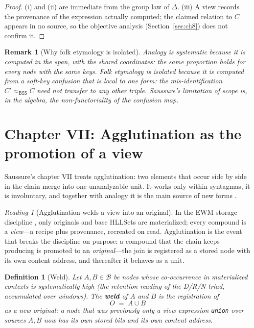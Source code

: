 \documentclass[11pt,a4paper]{article}
\newtheorem{definition}[principle]{Definition}
\newtheorem{remark}[principle]{Remark}
\theoremstyle{remark}
\newtheorem{reading}[principle]{Reading}
\newcommand{\Lat}{\ensuremath{\mathcal{B}}}              %
\newcommand{\xor}{\ensuremath{\Delta}}                   %
\newcommand{\BSS}{\ensuremath{\mathsf{BSS}}}             %
\begin{document}
\begin{proof}
(i) and (ii) are immediate from the group law of $\xor$. (iii) A view records
the provenance of the expression actually computed; the claimed relation to
$C$ appears in no source, so the objective analysis (Section~\ref{sec:ch8})
does not confirm it.
\end{proof}

\begin{remark}[Why folk etymology is isolated]
Analogy is systematic because it is computed in the span, with the shared
coordinates: the same proportion holds for every node with the same keys.
Folk etymology is isolated because it is computed from a soft-key confusion
that is local to one form: the mis-identification $C' \approx_{\BSS} C$ need
not transfer to any other triple. Saussure's limitation of scope is, in the
algebra, the non-functoriality of the confusion map.
\end{remark}

\section{Chapter VII: Agglutination as the promotion of a view}
\label{sec:ch7}

Saussure's chapter VII treats agglutination: two elements that occur side by
side in the chain merge into one unanalyzable unit. It works only within
syntagmas, it is involuntary, and together with analogy it is the main source
of new forms \cite[Part III, ch.~VII]{harris1983}.

\begin{reading}[Agglutination welds a view into an original]
\label{read:agglutination}
In the EWM storage discipline \cite{state2026}, only originals and base
HLLSets are materialized; every compound is a \emph{view}---a recipe plus
provenance, recreated on read. Agglutination is the event that breaks the
discipline on purpose: a compound that the chain keeps producing is promoted
to an \emph{original}---the join is registered as a stored node with its own
content address, and thereafter it behaves as a unit.
\end{reading}

\begin{definition}[Weld]
\label{def:weld}
Let $A, B \in \Lat$ be nodes whose co-occurrence in materialized contexts is
systematically high (the retention reading of the D/R/N triad, accumulated
over windows). The \textbf{weld} of $A$ and $B$ is the registration of
\[
  O \;=\; A \cup B
\]
as a new original: a node that was previously only a view expression
\texttt{union} over sources $A,B$ now has its own stored bits and its own
content address.
\end{definition}
\end{document}

